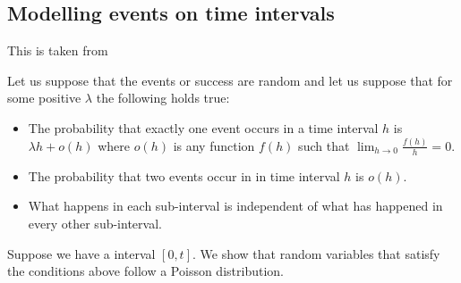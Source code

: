 \documentclass{article}
\begin{document}
\subsection{Modelling events on time intervals}
This is taken from \cite{ross98}

Let us suppose that the events or success are random and let us suppose that for some positive $\lambda$ the following holds true:
\begin{itemize}
    \item The probability that exactly one event occurs in a time interval $h$ is $\lambda h + o(h)$ where $o(h)$ is any function $f(h)$ such that $\lim_{h \rightarrow 0} \frac{f(h)}{h} = 0$.
    \item The probability that two events occur in in time interval $h$ is $o(h)$.
    \item What happens in each sub-interval is independent of what has happened in every other sub-interval.
\end{itemize}
Suppose we have a interval $[0, t]$. We show that random variables that satisfy the conditions above follow a Poisson distribution.
\end{document}
